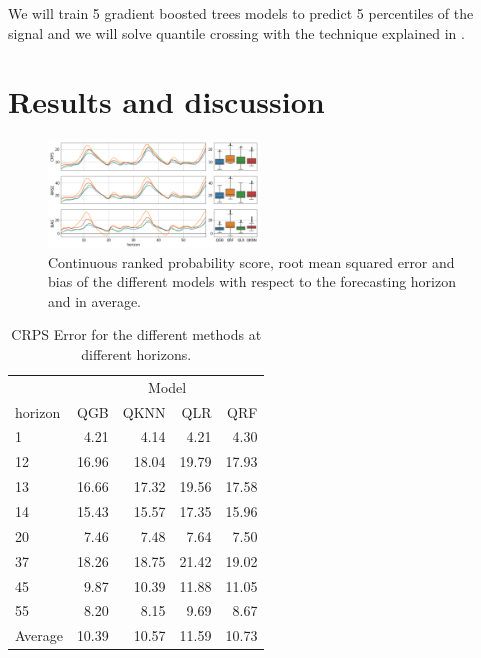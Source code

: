\documentclass[a4paper,twocolumn,5p]{elsarticle}
\begin{document}
We will train 5 gradient boosted trees models to predict 5 percentiles
of the \no signal and we will solve quantile 
crossing with the technique
explained in \cite{cross}.

\section{Results and discussion}
\label{sec:results}

\begin{figure}[tbp]
  \centering
  \includegraphics[width=0.5\textwidth]{error_graph}
  \caption{\label{figure:errorGraph}
    Continuous ranked probability score, root mean squared
    error and bias of the different models with respect to the
    forecasting horizon and in average.
  }
\end{figure}

\begin{table}[tbp]
  \centering
  \caption{\label{tab:determ}CRPS Error for the different methods at different
    horizons.
  }
  \begin{tabular}{lrrrr}
    \toprule
    & \multicolumn{4}{c}{Model} \\ \cmidrule{2-5} 
    horizon &    QGB &  QKNN &   QLR &   QRF \\
    \midrule
    1     &  4.21 &   4.14 &  4.21 &  4.30 \\
12    & 16.96 &  18.04 & 19.79 & 17.93 \\
13    & 16.66 &  17.32 & 19.56 & 17.58 \\
14    & 15.43 &  15.57 & 17.35 & 15.96 \\
20    &  7.46 &   7.48 &  7.64 &  7.50 \\
37    & 18.26 &  18.75 & 21.42 & 19.02 \\
45    &  9.87 &  10.39 & 11.88 & 11.05 \\
55    &  8.20 &   8.15 &  9.69 &  8.67 \\

    \midrule
    Average & 10.39 &  10.57 & 11.59 & 10.73 \\
    \bottomrule
  \end{tabular}
\end{table}
\end{document}
